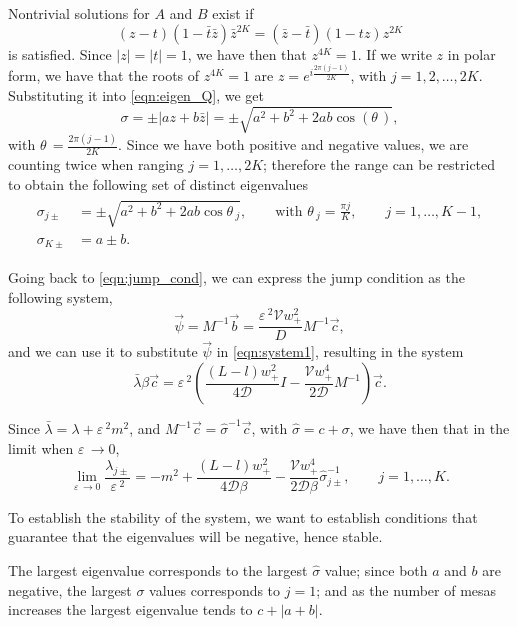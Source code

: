 \documentclass[a4paper,10pt]{article}
\newcommand{\tH}{\ensuremath{\theta\,}}
\newcommand{\lA}{\ensuremath{\lambda}}
\newcommand{\Ep}{\ensuremath{\varepsilon\,}}
\newcommand{\DD}{\ensuremath{\mathcal{D}}}
\newcommand{\VV}{\ensuremath{\mathcal{V}}}
\begin{document}
Nontrivial solutions for $A$ and $B$ exist if 
% 
\[
  (z-t)(1-\bar{t}\bar{z})\bar{z}^{2K} = (\bar{z}-\bar{t})(1-tz)z^{2K}
\]
% 
is satisfied. Since $|z| = |t| = 1$, we have then that $z^{4K} = 1$. If we write $z$ in polar form, we have that the roots of $z^{4K} = 1$ are $z=e^{i\frac{2\pi(j-1)}{2K}}$, with $j=1,2,\hdots,2K$. Substituting it into \eqref{eqn:eigen_Q}, we get
% 
\[
  \sigma = \pm|az + b\bar{z}| = \pm\sqrt{a^2 + b^2 + 2ab\cos(\tH)},
\]
% 
with $\tH = \frac{2\pi(j-1)}{2K}$. Since we have both positive and negative values, we are counting twice when ranging $j=1,\hdots,2K$; therefore the range can be restricted to obtain the following set of distinct eigenvalues
% 
\begin{equation}
\label{eqn:eigen_Q4}
\begin{split}
\begin{aligned}
  \sigma_{j\pm} &= \pm\sqrt{a^2 + b^2 + 2ab\cos\tH_j},\qquad\text{with  }\tH_j=\frac{\pi j}{K},\qquad j=1,	\hdots,K-1,\\
  \sigma_{K\pm} &= a\pm b.
\end{aligned}
\end{split}
\end{equation}

Going back to \eqref{eqn:jump_cond}, we can express the jump condition as the following system,
% 
\[
  \vec{\psi} = M^{-1}\vec{b} =\frac{\Ep^2\VV w_+^2}{D}M^{-1}\vec{c},
\]
% 
and we can use it to substitute $\vec{\psi}$ in \eqref{eqn:system1}, resulting in the system
%
\begin{equation}
  \bar{\lA}\beta\vec{c} = \Ep^2\left(\frac{(L-l)w_+^2}{4\DD}I - \frac{\VV w_+^4}{2\DD}M^{-1}\right)\vec{c}.
\end{equation}
% 

Since $\bar{\lA} = \lA + \Ep^2m^2$, and $M^{-1}\vec{c} = \hat\sigma^{-1}\vec{c}$, with $\hat\sigma = c+\sigma$, we have then that in the limit when $\Ep\rightarrow 0$,
% 
\begin{equation}
  \lim_{\Ep\rightarrow0}\frac{\lA_{j\pm}}{\Ep^2} = -m^2 + \frac{(L-l)w_+^2}{4\DD\beta} - \frac{\VV w_+^4}{2\DD\beta}\hat\sigma_{j\pm}^{-1},\qquad j=1,\hdots,K.
\end{equation}

To establish the stability of the system, we want to establish conditions that guarantee that the eigenvalues will be negative, hence stable. 

The largest eigenvalue corresponds to the largest $\hat\sigma$ value; since both $a$ and $b$ are negative, the largest $\sigma$ values corresponds to $j=1$; and as the number of mesas increases the largest eigenvalue tends to $c+|a+b|$. 
\end{document}
